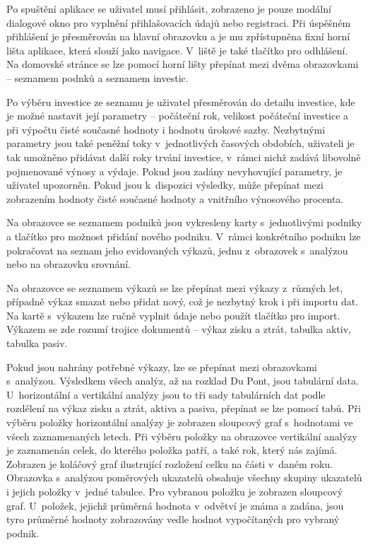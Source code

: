 Po spuštění aplikace se uživatel musí přihlásit, zobrazeno je pouze modální dialogové okno pro vyplnění přihlašovacích údajů nebo registraci. Při úspěšném přihlášení je přesměrován na hlavní obrazovku a je mu zpřístupněna fixní horní lišta aplikace, která slouží jako navigace. V~liště je také tlačítko pro odhlášení. Na domovské stránce se lze pomocí horní lišty přepínat mezi dvěma obrazovkami -- seznamem podnků a seznamem investic.

Po výběru investice ze seznamu je uživatel přesměrován do detailu investice, kde je možné nastavit její parametry -- počáteční rok, velikost počáteční investice a při výpočtu čisté současné hodnoty i hodnotu úrokové sazby. Nezbytnými parametry jsou také peněžní toky v~jednotlivých časových obdobích, uživateli je tak umožněno přidávat další roky trvání investice, v~rámci nichž zadává libovolně pojmenované výnosy a výdaje. Pokud jsou zadány nevyhovující parametry, je uživatel upozorněn. Pokud jsou k~dispozici výsledky, může přepínat mezi zobrazením hodnoty čisté současné hodnoty a vnitřního výnosového procenta.

Na obrazovce se seznamem podniků jsou vykresleny karty s~jednotlivými podniky a tlačítko pro možnost přidání nového podniku. V~rámci konkrétního podniku lze pokračovat na seznam jeho evidovaných výkazů, jednu z~obrazovek s~analýzou nebo na obrazovku srovnání. 

Na obrazovce se seznamem výkazů se lze přepínat mezi výkazy z~různých let, případně výkaz smazat nebo přidat nový, což je nezbytný krok i při importu dat. Na kartě s~výkazem lze ručně vyplnit údaje nebo použít tlačítko pro import. Výkazem se zde rozumí trojice dokumentů -- výkaz zisku a ztrát, tabulka aktiv, tabulka pasiv.

Pokud jsou nahrány potřebné výkazy, lze se přepínat mezi obrazovkami s~analýzou. Výsledkem všech analýz, až na rozklad Du Pont, jsou tabulární data. U~horizontální a vertikální analýzy jsou to tři sady tabulárních dat podle rozdělení na výkaz zisku a ztrát, aktiva a pasiva, přepínat se lze pomocí tabů. Při výběru položky horizontální analýzy je zobrazen sloupcový graf s~hodnotami ve všech zaznamenaných letech. Při výběru položky na obrazovce vertikální analýzy je zaznamenán celek, do kterého položka patří, a také rok, který nás zajímá. Zobrazen je koláčový graf ilustrující rozložení celku na části v~daném roku. Obrazovka s~analýzou poměrových ukazatelů obsahuje všechny skupiny ukazatelů i jejich položky v~jedné tabulce. Pro vybranou položku je zobrazen sloupcový graf. U~položek, jejichž průměrná hodnota v~odvětví je známa a zadána, jsou tyro průměrné hodnoty zobrazovány vedle hodnot vypočítaných pro vybraný podnik.

